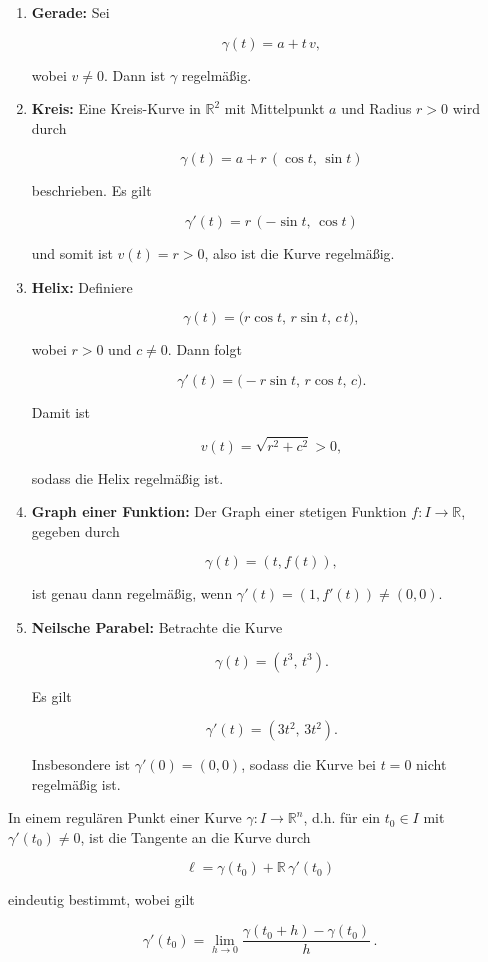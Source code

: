 \begin{beispielbox}
\begin{enumerate}
    \item \textbf{Gerade:} Sei 
    

$$
    \gamma(t) = a + t\,v,
    $$


    wobei $v \neq 0$. Dann ist $\gamma$ regelmäßig.

    \item \textbf{Kreis:} Eine Kreis-Kurve in $\mathbb{R}^2$ mit Mittelpunkt $a$ und Radius $r>0$ wird durch
    

$$
    \gamma(t) = a + r\,(\cos t,\, \sin t)
    $$


    beschrieben. Es gilt
    

$$
    \gamma'(t) = r\,(-\sin t,\, \cos t)
    $$


    und somit ist $v(t)=r>0$, also ist die Kurve regelmäßig.

    \item \textbf{Helix:} Definiere 
    

$$
    \gamma(t) = \bigl( r\cos t,\, r\sin t,\, c\,t \bigr),
    $$


    wobei $r>0$ und $c\neq 0$. Dann folgt
    

$$
    \gamma'(t) = \bigl( -r\sin t,\, r\cos t,\, c \bigr).
    $$


    Damit ist 
    

$$
    v(t)=\sqrt{r^2+c^2}>0,
    $$


    sodass die Helix regelmäßig ist.

    \item \textbf{Graph einer Funktion:} Der Graph einer stetigen Funktion $f : I \to \mathbb{R}$, gegeben durch
    

$$
    \gamma(t) = (t, f(t)),
    $$


    ist genau dann regelmäßig, wenn $\gamma'(t) = (1, f'(t)) \neq (0,0)$.

    \item \textbf{Neilsche Parabel:} Betrachte die Kurve
    

$$
    \gamma(t) = (t^3, \, t^3).
    $$


    Es gilt
    

$$
    \gamma'(t) = (3t^2,\, 3t^2).
    $$


    Insbesondere ist $\gamma'(0)=(0,0)$, sodass die Kurve bei $t=0$ nicht regelmäßig ist.
\end{enumerate}
\end{beispielbox}

\begin{bemerkungbox}
In einem regulären Punkt einer Kurve $\gamma : I \to \mathbb{R}^n$, d.h. für ein $t_0\in I$ mit $\gamma'(t_0)\neq 0$, ist die Tangente an die Kurve durch


$$
\ell = \gamma(t_0) + \mathbb{R}\,\gamma'(t_0)
$$


eindeutig bestimmt, wobei gilt


$$
\gamma'(t_0) = \lim_{h\to 0} \frac{\gamma(t_0+h)-\gamma(t_0)}{h}\,.
$$


\end{bemerkungbox}
